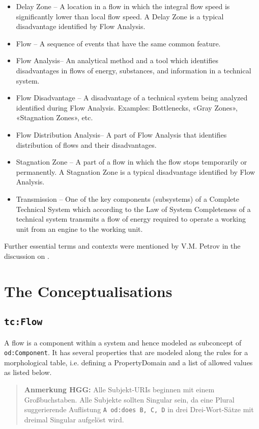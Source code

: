 \documentclass[11pt,a4paper]{article}
\newcommand{\HGG}[1]{\begin{quote}\textbf{Anmerkung HGG:} #1\end{quote}}
\begin{document}
\begin{itemize}[noitemsep]
\item Delay Zone -- A location in a flow in which the integral flow speed is
  significantly lower than local flow speed. A Delay Zone is a typical
  disadvantage identified by Flow Analysis. 
\item Flow -- A sequence of events that have the same common feature.
\item  Flow Analysis-- An analytical method and a tool which identifies
  disadvantages in flows of energy, substances, and information in a technical
  system.
\item  Flow Disadvantage -- A disadvantage of a technical system being
  analyzed identified during Flow Analysis. Examples: Bottlenecks, «Gray
  Zones», «Stagnation Zones», etc.
\item Flow Distribution Analysis-- A part of Flow Analysis that identifies
  distribution of flows and their disadvantages. 
\item Stagnation Zone -- A part of a flow in which the flow stops temporarily
  or permanently. A Stagnation Zone is a typical disadvantage identified by
  Flow Analysis.
\item Transmission -- One of the key components (subsystems) of a Complete
  Technical System which according to the Law of System Completeness of a
  technical system transmits a flow of energy required to operate a working
  unit from an engine to the working unit.
\end{itemize}
Further essential terms and contexts were mentioned by V.M. Petrov in the
discussion on \cite{Eckardt2020}. 

\section{The Conceptualisations}

\subsection{\texttt{tc:Flow}}

A flow is a component within a system and hence modeled as subconcept of
\texttt{od:Component}.  It has several properties that are modeled along the
rules for a morphological table, i.e. defining a PropertyDomain and a list of
allowed values as listed below.

\HGG{Alle Subjekt-URIs beginnen mit einem Großbuchstaben.  Alle Subjekte
  sollten Singular sein, da eine Plural suggerierende Auflistung \texttt{A
    od:does B, C, D} in drei Drei-Wort-Sätze mit dreimal Singular aufgelöst
  wird.}
\end{document}
